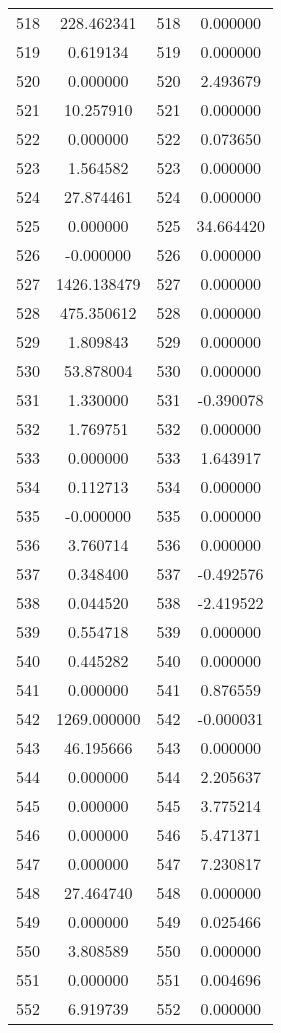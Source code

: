 \documentclass[12pt]{article}
\begin{document}
\begin{longtable}{@{}cccc@{}}
518 & 228.462341 & 518 & 0.000000 \\
519 & 0.619134 & 519 & 0.000000 \\
520 & 0.000000 & 520 & 2.493679 \\
521 & 10.257910 & 521 & 0.000000 \\
522 & 0.000000 & 522 & 0.073650 \\
523 & 1.564582 & 523 & 0.000000 \\
524 & 27.874461 & 524 & 0.000000 \\
525 & 0.000000 & 525 & 34.664420 \\
526 & -0.000000 & 526 & 0.000000 \\
527 & 1426.138479 & 527 & 0.000000 \\
528 & 475.350612 & 528 & 0.000000 \\
529 & 1.809843 & 529 & 0.000000 \\
530 & 53.878004 & 530 & 0.000000 \\
531 & 1.330000 & 531 & -0.390078 \\
532 & 1.769751 & 532 & 0.000000 \\
533 & 0.000000 & 533 & 1.643917 \\
534 & 0.112713 & 534 & 0.000000 \\
535 & -0.000000 & 535 & 0.000000 \\
536 & 3.760714 & 536 & 0.000000 \\
537 & 0.348400 & 537 & -0.492576 \\
538 & 0.044520 & 538 & -2.419522 \\
539 & 0.554718 & 539 & 0.000000 \\
540 & 0.445282 & 540 & 0.000000 \\
541 & 0.000000 & 541 & 0.876559 \\
542 & 1269.000000 & 542 & -0.000031 \\
543 & 46.195666 & 543 & 0.000000 \\
544 & 0.000000 & 544 & 2.205637 \\
545 & 0.000000 & 545 & 3.775214 \\
546 & 0.000000 & 546 & 5.471371 \\
547 & 0.000000 & 547 & 7.230817 \\
548 & 27.464740 & 548 & 0.000000 \\
549 & 0.000000 & 549 & 0.025466 \\
550 & 3.808589 & 550 & 0.000000 \\
551 & 0.000000 & 551 & 0.004696 \\
552 & 6.919739 & 552 & 0.000000 \\

\end{longtable}
\end{document}
